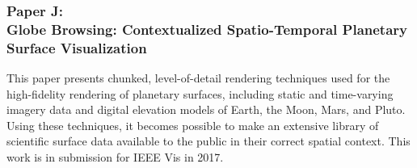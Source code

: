 \subsubsection{Paper J:\\Globe Browsing: Contextualized Spatio-Temporal Planetary Surface Visualization}
This paper presents chunked, level-of-detail rendering techniques used for the high-fidelity rendering of planetary surfaces, including static and time-varying imagery data and digital elevation models of Earth, the Moon, Mars, and Pluto.  Using these techniques, it becomes possible to make an extensive library of scientific surface data available to the public in their correct spatial context.  This work is in submission for IEEE Vis in 2017.
